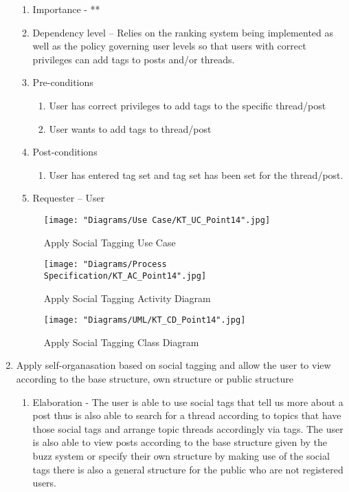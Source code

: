 \documentclass[12pt]{article}
\begin{document}
\begin{enumerate}
\begin{enumerate}
    \item Importance - **
    \item Dependency level – Relies on the ranking system being implemented as well as the policy governing user levels so that users with correct privileges can add tags to posts and/or threads.
    \item Pre-conditions
    \begin{enumerate}
    	\item User has correct privileges to add tags to the specific thread/post
    	\item User wants to add tags to thread/post
    \end{enumerate}
        \item Post-conditions
    \begin{enumerate}
    	\item User has entered tag set and tag set has been set for the thread/post.
    \end{enumerate}
    \item Requester – User
  \end{enumerate}
\begin{figure}[h]
	\centering
	\texttt{[image: "Diagrams/Use Case/KT\_UC\_Point14".jpg]}
	\caption{Apply Social Tagging Use Case}
\end{figure}
\begin{figure}[h]
	\centering
	\texttt{[image: "Diagrams/Process Specification/KT\_AC\_Point14".jpg]}
	\caption{Apply Social Tagging Activity Diagram}
\end{figure}
\begin{figure}[h]
	\centering
	\texttt{[image: "Diagrams/UML/KT\_CD\_Point14".jpg]}
	\caption{Apply Social Tagging Class Diagram}
\end{figure}
\clearpage %
   \item Apply self-organasation based on social tagging and allow the user to view according to the base structure, own structure or public structure %
  \begin{enumerate}
    \item Elaboration - The user is able to use social tags that tell us more about a post thus is also able to search for a thread according to topics that have those social tags and arrange topic threads accordingly via tags. The user is also able to view posts according to the base structure given by the buzz system or specify their own structure by making use of the social tags there is also a general structure for the public who are not registered users. 

\end{enumerate}
\end{enumerate}
\end{document}
